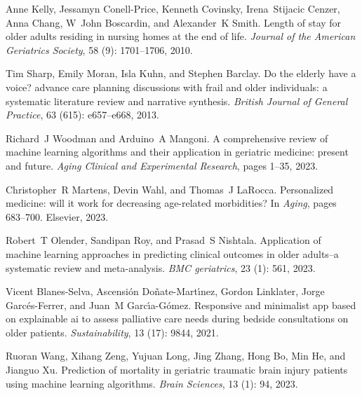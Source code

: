 \documentclass{article}
\begin{document}
\begin{thebibliography}{60}
Anne Kelly, Jessamyn Conell-Price, Kenneth Covinsky, Irena~Stijacic Cenzer,
  Anna Chang, W~John Boscardin, and Alexander~K Smith.
\newblock Length of stay for older adults residing in nursing homes at the end
  of life.
\newblock \emph{Journal of the American Geriatrics Society}, 58
  (9): 1701--1706, 2010.

Tim Sharp, Emily Moran, Isla Kuhn, and Stephen Barclay.
\newblock Do the elderly have a voice? advance care planning discussions with
  frail and older individuals: a systematic literature review and narrative
  synthesis.
\newblock \emph{British Journal of General Practice}, 63
  (615): e657--e668, 2013.

Richard~J Woodman and Arduino~A Mangoni.
\newblock A comprehensive review of machine learning algorithms and their
  application in geriatric medicine: present and future.
\newblock \emph{Aging Clinical and Experimental Research}, pages 1--35, 2023.

Christopher~R Martens, Devin Wahl, and Thomas~J LaRocca.
\newblock Personalized medicine: will it work for decreasing age-related
  morbidities?
\newblock In \emph{Aging}, pages 683--700. Elsevier, 2023.

Robert~T Olender, Sandipan Roy, and Prasad~S Nishtala.
\newblock Application of machine learning approaches in predicting clinical
  outcomes in older adults--a systematic review and meta-analysis.
\newblock \emph{BMC geriatrics}, 23 (1): 561, 2023.

Vicent Blanes-Selva, Ascensi{\'o}n Do{\~n}ate-Mart{\'\i}nez, Gordon Linklater,
  Jorge Garc{\'e}s-Ferrer, and Juan~M Garc{\'\i}a-G{\'o}mez.
\newblock Responsive and minimalist app based on explainable ai to assess
  palliative care needs during bedside consultations on older patients.
\newblock \emph{Sustainability}, 13 (17): 9844, 2021.

Ruoran Wang, Xihang Zeng, Yujuan Long, Jing Zhang, Hong Bo, Min He, and Jianguo
  Xu.
\newblock Prediction of mortality in geriatric traumatic brain injury patients
  using machine learning algorithms.
\newblock \emph{Brain Sciences}, 13 (1): 94, 2023.


\end{thebibliography}
\end{document}
